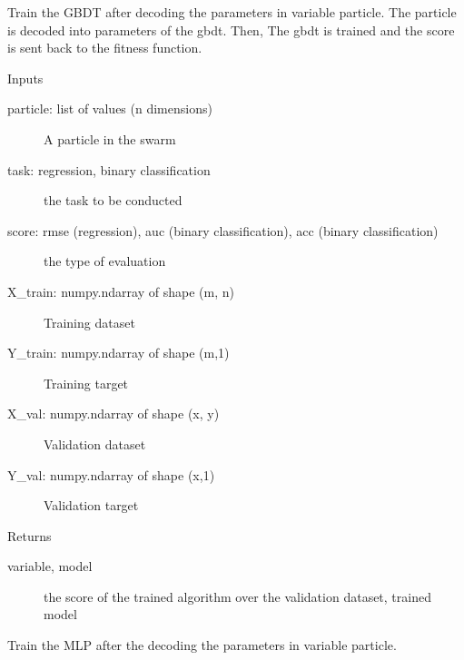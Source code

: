 \documentclass[letterpaper,10pt,english]{sphinxmanual}
\begin{document}
\begin{fulllineitems}
\begin{fulllineitems}
\label{\detokenize{index:pspso.pspso.forward_prop_gbdt}}
Train the GBDT after decoding the parameters in variable particle.
The particle is decoded into parameters of the gbdt. Then, The gbdt is trained and the score is sent back to the fitness function.

Inputs
\begin{description}
\item[{particle: list of values (n dimensions)}] \leavevmode
A particle in the swarm

\item[{task: regression, binary classification}] \leavevmode
the task to be conducted

\item[{score: rmse (regression), auc (binary classification), acc (binary classification)}] \leavevmode
the type of evaluation

\item[{X\_train: numpy.ndarray of shape (m, n)}] \leavevmode
Training dataset

\item[{Y\_train: numpy.ndarray of shape (m,1)}] \leavevmode
Training target

\item[{X\_val: numpy.ndarray of shape (x, y)}] \leavevmode
Validation dataset

\item[{Y\_val: numpy.ndarray of shape (x,1)}] \leavevmode
Validation target

\end{description}

Returns
\begin{description}
\item[{variable, model}] \leavevmode
the score of the trained algorithm over the validation dataset, trained model

\end{description}

\end{fulllineitems}


\begin{fulllineitems}
\label{\detokenize{index:pspso.pspso.forward_prop_mlp}}
Train the MLP after the decoding the parameters in variable particle.


\end{fulllineitems}
\end{fulllineitems}
\end{document}
